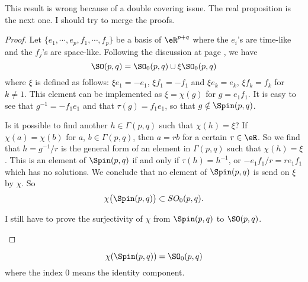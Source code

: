 \begin{probleme}
	This result is wrong because of a double covering issue. The real proposition is the next one. I should try to merge the proofs.
\end{probleme}

\begin{proof}
	Let $\{ e_1,\cdots,e_p,f_1,\cdots,f_p \}$ be a basis of $\eR^{p+q}$ where the $e_i$'s are time-like and the $f_j$'s are space-like.
	Following the discussion at page \pageref{PgDisGeoConnSO}, we have
	\[
		\SO(p,q)=\SO_0(p,q)\cup\xi \SO_0(p,q)
	\]
	where $\xi$ is defined as follows: $\xi e_1=-e_1$, $\xi f_1=-f_1$ and $\xi e_k=e_k$, $\xi f_k=f_k$ for $k\neq 1$. This element can be implemented as $\xi=\chi(g)$ for $g=e_1f_1$. It is easy to see that $g^{-1}=-f_1e_1$ and that $\tau(g)=f_1e_1$, so that $g\notin\Spin(p,q)$.

	Is it possible to find another $h\in\Gamma(p,q)$ such that $\chi(h)=\xi$? If $\chi(a)=\chi(b)$ for $a$, $b\in\Gamma(p,q)$, then $a=rb$ for a certain $r\in\eR$. So we find that $h=g^{-1}/r$ is the general form of an element in $\Gamma(p,q)$ such that $\chi(h)=\xi$. This is an element of $\Spin(p,q)$ if and only if $\tau(h)=h^{-1}$, or $-e_1f_1/r=re_1f_1$ which has no solutions. We conclude that no element of $\Spin(p,q)$ is send on $\xi$ by $\chi$. So
	\[
		\chi\big( \Spin(p,q) \big)\subset SO_0(p,q).
	\]

	\begin{probleme}
		I still have to prove the surjectivity of $\chi$ from $\Spin(p,q)$ to $\SO(p,q)$.
	\end{probleme}

\end{proof}
\begin{theorem}
	\begin{equation}	\label{EqchiSpinSO}
		\chi(\Spin(p,q))=\SO_0(p,q)
	\end{equation}
	where the index $0$ means the identity component.
\end{theorem}

